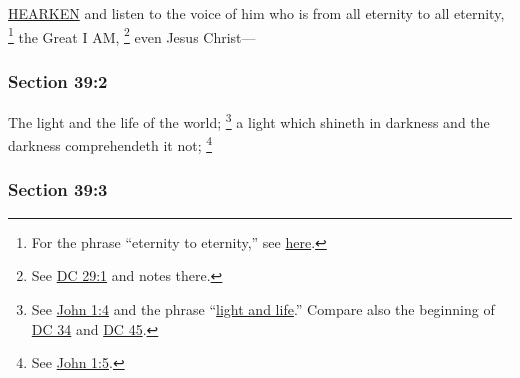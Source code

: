 		\hyperref[HEARKEN]{HEARKEN} and listen to the voice of him who is from all eternity to all eternity,%
			\footnote{%
				For the phrase ``eternity to eternity,'' see \hyperref[ETERNITY-PHRASES]{here}.
				}
		the Great I AM,%
			\footnote{%
				See \hyperref[DC29-1]{DC 29:1} and notes there.
				}
		even Jesus Christ---


	\subsubsection{Section 39:2} %
		\label{DC39-2}

		The light and the life of the world;%
			\footnote{%
				See \hyperref[JOHN-1-4]{John 1:4} and the phrase ``\hyperref[LIGHT-PHRASES]{light and life}.'' Compare also the beginning of \hyperref[DC34]{DC 34} and \hyperref[DC45]{DC 45}.
				}
		a light which shineth in darkness and the darkness comprehendeth it not;%
			\footnote{%
				See \hyperref[JOHN-1-5]{John 1:5}.
				}


	\subsubsection{Section 39:3} %
		\label{DC39-3}

